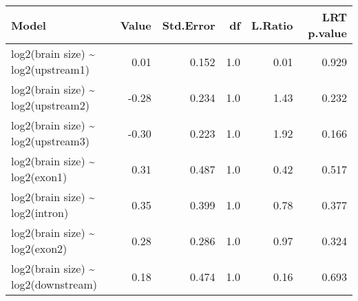 \begin{table}[ht]
\centering
\begin{tabular}{lrrrrr}
  \hline
Model & Value & Std.Error & df & L.Ratio & LRT p.value \\ 
  \hline
log2(brain size) \~{} log2(upstream1) & 0.01 & 0.152 & 1.0 & 0.01 & 0.929 \\ 
  log2(brain size) \~{} log2(upstream2) & -0.28 & 0.234 & 1.0 & 1.43 & 0.232 \\ 
  log2(brain size) \~{} log2(upstream3) & -0.30 & 0.223 & 1.0 & 1.92 & 0.166 \\ 
  log2(brain size) \~{} log2(exon1) & 0.31 & 0.487 & 1.0 & 0.42 & 0.517 \\ 
  log2(brain size) \~{} log2(intron) & 0.35 & 0.399 & 1.0 & 0.78 & 0.377 \\ 
  log2(brain size) \~{} log2(exon2) & 0.28 & 0.286 & 1.0 & 0.97 & 0.324 \\ 
  log2(brain size) \~{} log2(downstream) & 0.18 & 0.474 & 1.0 & 0.16 & 0.693 \\ 
   \hline
\end{tabular}
\end{table}
